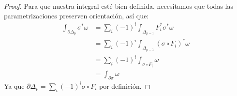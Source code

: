 \documentclass[spanish]{article}
\theoremstyle{definition}
\begin{document}
\begin{proof}
		Para que nuestra integral esté bien definida, necesitamos que todas las parametrizaciones preserven orientación, así que:
		\begin{align*}
			\int_{\partial\Delta_p}\sigma^*\omega&=\sum_i(-1)^i\int_{\Delta_{p-1}}F^*_{i}\sigma^*\omega\\
			&=\sum_i(-1)^i\int_{\Delta_{p-1}}(\sigma\circ F_{i})^*\omega\\
			&=\sum_i(-1)^i\int_{\sigma\circ F_i}\omega\\
			&=\int_{\partial\sigma}\omega
		\end{align*}
		Ya que  $\partial\Delta_p=\sum_i(-1)^i\sigma\circ F_{i}$ por definición.
	\end{proof}
	
\end{document}
